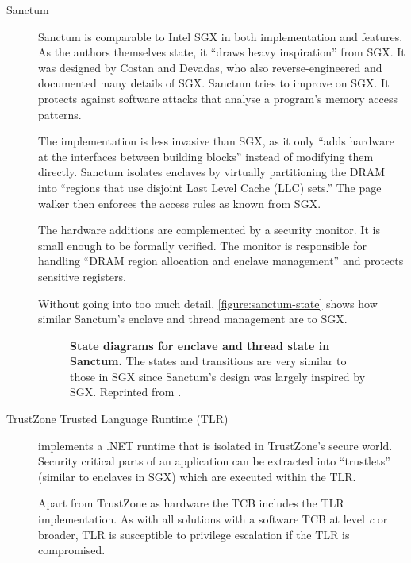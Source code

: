 \begin{description}\label{ID_845705882}
\item[Sanctum\cite{Costan}]\label{ID_50257265}
Sanctum is comparable to Intel SGX in both implementation and features. As the authors themselves state, it ``draws heavy inspiration'' from SGX. It was designed by Costan and Devadas, who also reverse-engineered and documented many details of SGX.\cite[]{sgx-explained}\label{ID_916368692}
Sanctum tries to improve on SGX. It protects against software attacks that analyse a program's memory access patterns.\label{ID_1386160732}

The implementation is less invasive than SGX, as it only ``adds hardware at the interfaces between building blocks'' instead of modifying them directly.\label{ID_808280017}
Sanctum isolates enclaves by virtually partitioning the DRAM into ``regions that use disjoint Last Level Cache (LLC) sets.'' The page walker then enforces the access rules as known from SGX.\label{ID_1748783794}

The hardware additions are complemented by a security monitor. It is small enough to be formally verified. The monitor is responsible for handling ``DRAM region allocation and enclave management'' and protects sensitive registers.\cite[]{Costan}\label{ID_1617987140}

Without going into too much detail, \autoref{figure:sanctum-state} shows how similar Sanctum's enclave and thread management are to SGX.\label{ID_1825665924}
\begin{figure}[htbp]
\makebox[\textwidth][c]{
}\caption{\textbf{State diagrams for enclave and thread state in Sanctum.}\label{ID_1455628057}
The states and transitions are very similar to those in SGX since Sanctum's design was largely inspired by SGX.\label{ID_388325382}
Reprinted from \cite{Costan}.\label{ID_615159607}
\label{ID_486639489}\label{figure:sanctum-state}}
\end{figure}

\item[TrustZone Trusted Language Runtime (TLR)\cite{Santos2014}]\label{ID_1712498850}
implements a .NET runtime that is isolated in TrustZone's secure world. Security critical parts of an application can be extracted into ``trustlets'' (similar to enclaves in SGX) which are executed within the TLR.\label{ID_843781337}

Apart from TrustZone as hardware the TCB includes the TLR implementation. As with all solutions with a software TCB at level \textit{c} or broader, TLR is susceptible to privilege escalation if the TLR is compromised.\label{ID_456338807}


\end{description}
